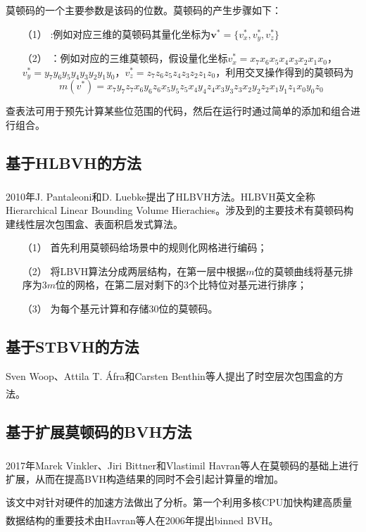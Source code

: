 \documentclass[11pt]{article}
\newcommand{\upcite}[1]{\textsuperscript{\textsuperscript{\cite{#1}}}}
\begin{document}
\par 莫顿码的一个主要参数是该码的位数。莫顿码的产生步骤如下：
\begin{itemize}
\item[（1）]{}:例如对应三维的莫顿码其量化坐标为$\bm{v}^{*}=\{v_x^{*},v_y^{*},v_z^{*}\}$

\item[（2）]{}：例如对应的三维莫顿码，假设量化坐标$v_x^{*}=x_7x_6x_5x_4x_3x_2x_1x_0$，$v_y^{*}=y_7y_6y_5y_4y_3y_2y_1y_0$，$v_z^{*}=z_7z_6z_5z_4z_3z_2z_1z_0$，利用交叉操作得到的莫顿码为
$$
m(v^{*})=x_7y_7z_7x_6y_6z_6x_5y_5z_5x_4y_4z_4x_3y_3z_3x_2y_2z_2x_1y_1z_1x_0y_0z_0
$$
\end{itemize}
查表法可用于预先计算某些位范围的代码，然后在运行时通过简单的添加和组合进行组合。

\subsection{基于HLBVH的方法}
2010年J. Pantaleoni和D. Luebke提出了HLBVH方法\upcite{HLBVH}。HLBVH英文全称Hierarchical Linear Bounding Volume Hierachies。涉及到的主要技术有莫顿码构建线性层次包围盒、表面积启发式算法。
\begin{itemize}
\item[（1）]{首先利用莫顿码给场景中的规则化网格进行编码；}
\item[（2）]{将LBVH算法分成两层结构，在第一层中根据$m$位的莫顿曲线将基元排序为$3m$位的网格，在第二层对剩下的3个比特位对基元进行排序；}
\item[（3）]{为每个基元计算和存储30位的莫顿码。}

\end{itemize}


\subsection{基于STBVH的方法}
Sven Woop、Attila T. Áfra和Carsten Benthin等人提出了时空层次包围盒的方法\upcite{STBVH}。

\subsection{基于扩展莫顿码的BVH方法}
2017年Marek Vinkler、Jiri Bittner和Vlastimil Havran\upcite{accelerator2}等人在莫顿码的基础上进行扩展，从而在提高BVH构造结果的同时不会引起计算量的增加。
\par 该文中对针对硬件的加速方法做出了分析。第一个利用多核CPU加快构建高质量数据结构的重要技术由Havran等人在2006年提出binned BVH\upcite{cpus1}。
\end{document}
